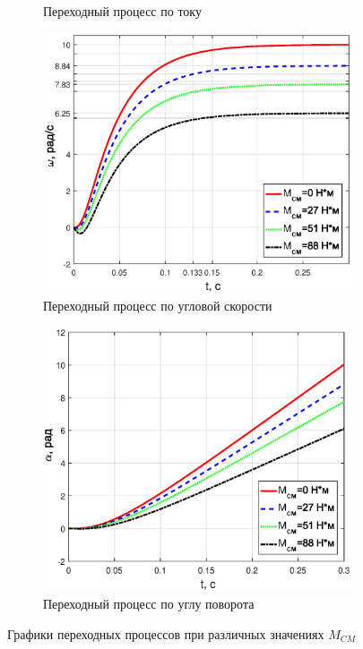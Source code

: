 \documentclass[12pt,a4paper]{article}
\begin{document}
\begin{figure}[H]
\begin{subfigure}[b]{0.48\textwidth}
		\caption{Переходный процесс по току}
	\end{subfigure}
	\begin{subfigure}[b]{0.48\textwidth}
		\includegraphics[width = \textwidth]{w1}
		\caption{Переходный процесс по угловой скорости}
	\end{subfigure}
	\hfill
	\begin{subfigure}[b]{0.48\textwidth}
		\includegraphics[width = \textwidth]{a1}
		\caption{Переходный процесс по углу поворота}
	\end{subfigure}
	\caption{Графики переходных процессов при различных значениях $M_{CM}$}
	\label{UIwa1}
\end{figure}
\end{document}
